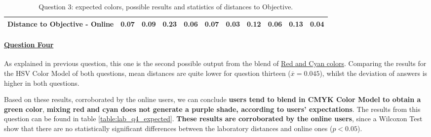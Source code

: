 \begin{table}[H]
{\begin{tabular}{lccccccccccccc}
    \multicolumn{4}{l}{Distance to Objective - Online}                                                                                               & \multicolumn{1}{|c}{\textbf{0.07}}        & \multicolumn{1}{c|}{0.09}    & \multicolumn{1}{|c}{0.23}        & \multicolumn{1}{c|}{0.06}    & \multicolumn{1}{|c}{\textbf{0.07}}       & \multicolumn{1}{c|}{0.03}    & \multicolumn{1}{|c}{0.12}        & \multicolumn{1}{c|}{0.06}    & \multicolumn{1}{|c}{0.13}       & \multicolumn{1}{c|}{0.04}    \\ \hline
    \end{tabular}}
  \caption[Question 3, with expected Results.]{Question 3: expected colors, possible results and statistics of distances to Objective.}
  \label{table:lab_q3_expected}
\end{table}
%
\paragraph{\ul{Question Four}}
%
As explained in previous question, this one is the second possible output from the blend of \ul{Red and Cyan colors}. Comparing the results for the HSV Color Model of both questions, mean distances are quite lower for question thirteen
($\overline{x} = 0.045$), whilst the deviation of answers is higher in both questions. \par
%
Based on these results, corroborated by the online users, we can conclude \textbf{users tend to blend in CMYK Color Model to obtain a green color}, \textbf{mixing red and cyan
does not generate a purple shade, according to users' expectations}. The results from this question can be found in table \ref{table:lab_q4_expected}. \textbf{These results are
corroborated by the online users}, since a Wilcoxon Test show that there are no statistically significant differences between the laboratory distances and online ones ($p < 0.05$).
%
